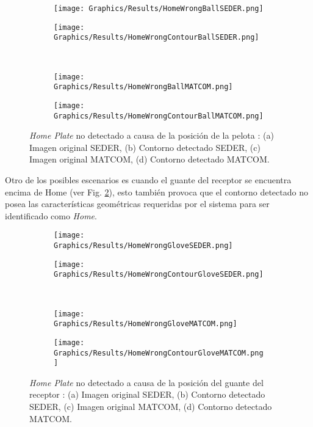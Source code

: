 \begin{figure}[h!]
    \centering
    \begin{subfigure}[b]{0.32\linewidth}
        \texttt{[image: Graphics/Results/HomeWrongBallSEDER.png]}
        \caption{}
    \end{subfigure}
    \begin{subfigure}[b]{0.32\linewidth}
        \texttt{[image: Graphics/Results/HomeWrongContourBallSEDER.png]}
        \caption{}
    \end{subfigure}\\
    \begin{subfigure}[b]{0.32\linewidth}
        \texttt{[image: Graphics/Results/HomeWrongBallMATCOM.png]}
        \caption{}
    \end{subfigure}
    \begin{subfigure}[b]{0.32\linewidth}
        \texttt{[image: Graphics/Results/HomeWrongContourBallMATCOM.png]}
        \caption{}
    \end{subfigure}
    \caption{\textit{Home Plate} no detectado a causa de la posición de la pelota : (a) Imagen original SEDER, (b) Contorno detectado SEDER, (c) Imagen original MATCOM, (d) Contorno detectado MATCOM.}
    \label{fig:WrongHomeBall}
\end{figure}

Otro de los posibles escenarios es cuando el guante del receptor se encuentra encima de Home (ver Fig. \ref{fig:WrongHomeGlove}), esto también provoca que el contorno detectado no posea las características geométricas requeridas por el sistema para ser identificado como \textit{Home}.

\begin{figure}[h!]
    \centering
    \begin{subfigure}[b]{0.32\linewidth}
        \texttt{[image: Graphics/Results/HomeWrongGloveSEDER.png]}
        \caption{}
    \end{subfigure}
    \begin{subfigure}[b]{0.32\linewidth}
        \texttt{[image: Graphics/Results/HomeWrongContourGloveSEDER.png]}
        \caption{}
    \end{subfigure}\\
    \begin{subfigure}[b]{0.32\linewidth}
        \texttt{[image: Graphics/Results/HomeWrongGloveMATCOM.png]}
        \caption{}
    \end{subfigure}
    \begin{subfigure}[b]{0.32\linewidth}
        \texttt{[image: Graphics/Results/HomeWrongContourGloveMATCOM.png]}
        \caption{}
    \end{subfigure}
    \caption{\textit{Home Plate} no detectado a causa de la posición del guante del receptor : (a) Imagen original SEDER, (b) Contorno detectado SEDER, (c) Imagen original MATCOM, (d) Contorno detectado MATCOM.}
    \label{fig:WrongHomeGlove}
\end{figure}

